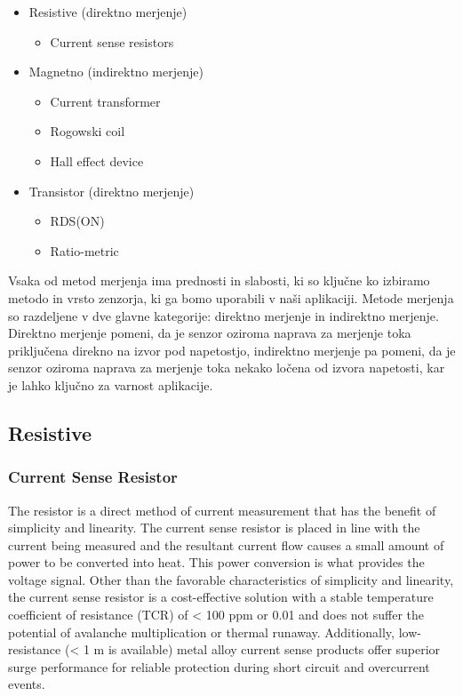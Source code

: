 \documentclass[12pt,a4paper,titlepage,openany]{report}
\begin{document}
\begin{itemize}
\item Resistive (direktno merjenje)

\begin{itemize}
\item Current sense resistors
\end{itemize}

 \item Magnetno (indirektno merjenje)

\begin{itemize}
\item Current transformer
\item Rogowski coil
\item Hall effect device
\end{itemize}

\item Transistor (direktno merjenje)

\begin{itemize}
\item RDS(ON)
\item Ratio-metric
\end{itemize}

\end{itemize}

Vsaka od metod merjenja ima prednosti in slabosti, ki so ključne ko izbiramo metodo in vrsto zenzorja, ki ga bomo uporabili
v naši aplikaciji. Metode merjenja so razdeljene v dve glavne kategorije: direktno merjenje in indirektno merjenje.
Direktno merjenje pomeni, da je senzor oziroma naprava za merjenje toka priključena direkno na izvor pod napetostjo, 
indirektno merjenje pa pomeni, da je senzor oziroma naprava za merjenje toka nekako ločena od izvora napetosti, 
kar je lahko ključno za varnost aplikacije.

\subsection{Resistive}
\subsubsection{Current Sense Resistor}
The resistor is a direct method of current measurement that has the benefit of simplicity and linearity. The current sense resistor
is placed in line with the current being measured and the resultant current flow causes a small amount of power to be converted
into heat. This power conversion is what provides the voltage signal. Other than the favorable characteristics of simplicity and
linearity, the current sense resistor is a cost-effective solution with a stable temperature coefficient of resistance (TCR) of
< 100 ppm or 0.01  and does not suffer the potential of avalanche multiplication or thermal runaway. Additionally,
low-resistance (< 1 m is available) metal alloy current sense products offer superior surge performance for reliable protection
during short circuit and overcurrent events.
\end{document}
